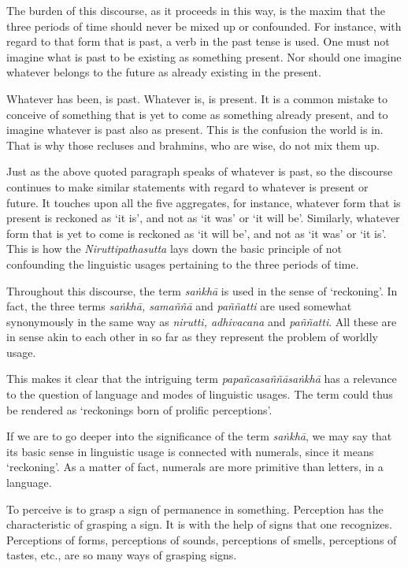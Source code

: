 The burden of this discourse, as it proceeds in this way, is the maxim that the three periods of time should never be mixed up or confounded. For instance, with regard to that form that is past, a verb in the past tense is used. One must not imagine what is past to be existing as something present. Nor should one imagine whatever belongs to the future as already existing in the present.

Whatever has been, is past. Whatever is, is present. It is a common mistake to conceive of something that is yet to come as something already present, and to imagine whatever is past also as present. This is the confusion the world is in. That is why those recluses and brahmins, who are wise, do not mix them up.

Just as the above quoted paragraph speaks of whatever is past, so the discourse continues to make similar statements with regard to whatever is present or future. It touches upon all the five aggregates, for instance, whatever form that is present is reckoned as `it is', and not as `it was' or `it will be'. Similarly, whatever form that is yet to come is reckoned as `it will be', and not as `it was' or `it is'. This is how the \emph{Niruttipathasutta} lays down the basic principle of not confounding the linguistic usages pertaining to the three periods of time.

Throughout this discourse, the term \emph{saṅkhā} is used in the sense of `reckoning'. In fact, the three terms \emph{saṅkhā, samaññā} and \emph{paññatti} are used somewhat synonymously in the same way as \emph{nirutti, adhivacana} and \emph{paññatti}. All these are in sense akin to each other in so far as they represent the problem of worldly usage.

This makes it clear that the intriguing term \emph{papañcasaññāsaṅkhā} has a relevance to the question of language and modes of linguistic usages. The term could thus be rendered as `reckonings born of prolific perceptions'.

If we are to go deeper into the significance of the term \emph{saṅkhā}, we may say that its basic sense in linguistic usage is connected with numerals, since it means `reckoning'. As a matter of fact, numerals are more primitive than letters, in a language.

To perceive is to grasp a sign of permanence in something. Perception has the characteristic of grasping a sign. It is with the help of signs that one recognizes. Perceptions of forms, perceptions of sounds, perceptions of smells, perceptions of tastes, etc., are so many ways of grasping signs.

